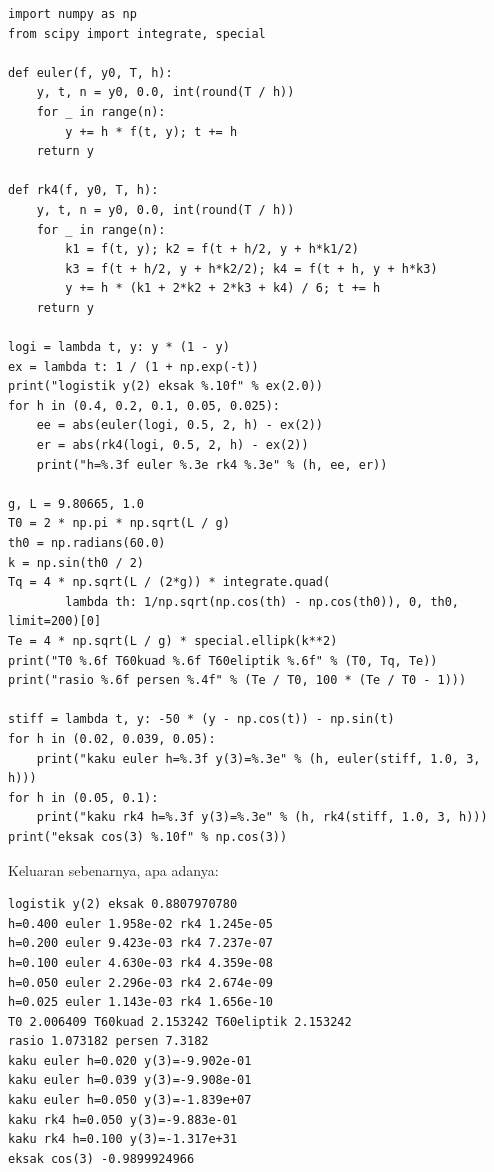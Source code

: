 \begin{lab}
\begin{verbatim}
import numpy as np
from scipy import integrate, special

def euler(f, y0, T, h):
    y, t, n = y0, 0.0, int(round(T / h))
    for _ in range(n):
        y += h * f(t, y); t += h
    return y

def rk4(f, y0, T, h):
    y, t, n = y0, 0.0, int(round(T / h))
    for _ in range(n):
        k1 = f(t, y); k2 = f(t + h/2, y + h*k1/2)
        k3 = f(t + h/2, y + h*k2/2); k4 = f(t + h, y + h*k3)
        y += h * (k1 + 2*k2 + 2*k3 + k4) / 6; t += h
    return y

logi = lambda t, y: y * (1 - y)
ex = lambda t: 1 / (1 + np.exp(-t))
print("logistik y(2) eksak %.10f" % ex(2.0))
for h in (0.4, 0.2, 0.1, 0.05, 0.025):
    ee = abs(euler(logi, 0.5, 2, h) - ex(2))
    er = abs(rk4(logi, 0.5, 2, h) - ex(2))
    print("h=%.3f euler %.3e rk4 %.3e" % (h, ee, er))

g, L = 9.80665, 1.0
T0 = 2 * np.pi * np.sqrt(L / g)
th0 = np.radians(60.0)
k = np.sin(th0 / 2)
Tq = 4 * np.sqrt(L / (2*g)) * integrate.quad(
        lambda th: 1/np.sqrt(np.cos(th) - np.cos(th0)), 0, th0, limit=200)[0]
Te = 4 * np.sqrt(L / g) * special.ellipk(k**2)
print("T0 %.6f T60kuad %.6f T60eliptik %.6f" % (T0, Tq, Te))
print("rasio %.6f persen %.4f" % (Te / T0, 100 * (Te / T0 - 1)))

stiff = lambda t, y: -50 * (y - np.cos(t)) - np.sin(t)
for h in (0.02, 0.039, 0.05):
    print("kaku euler h=%.3f y(3)=%.3e" % (h, euler(stiff, 1.0, 3, h)))
for h in (0.05, 0.1):
    print("kaku rk4 h=%.3f y(3)=%.3e" % (h, rk4(stiff, 1.0, 3, h)))
print("eksak cos(3) %.10f" % np.cos(3))
\end{verbatim}
\end{lab}

Keluaran sebenarnya, apa adanya:

\begin{verbatim}
logistik y(2) eksak 0.8807970780
h=0.400 euler 1.958e-02 rk4 1.245e-05
h=0.200 euler 9.423e-03 rk4 7.237e-07
h=0.100 euler 4.630e-03 rk4 4.359e-08
h=0.050 euler 2.296e-03 rk4 2.674e-09
h=0.025 euler 1.143e-03 rk4 1.656e-10
T0 2.006409 T60kuad 2.153242 T60eliptik 2.153242
rasio 1.073182 persen 7.3182
kaku euler h=0.020 y(3)=-9.902e-01
kaku euler h=0.039 y(3)=-9.908e-01
kaku euler h=0.050 y(3)=-1.839e+07
kaku rk4 h=0.050 y(3)=-9.883e-01
kaku rk4 h=0.100 y(3)=-1.317e+31
eksak cos(3) -0.9899924966
\end{verbatim}

